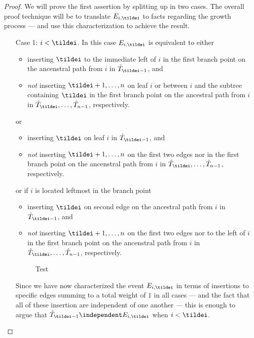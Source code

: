 \begin{proof}
    We will prove the first assertion by splitting up in two cases.
    The overall proof technique will be to translate $E_{i, \tildei}$ to facts regarding the growth process --- and use this characterization to achieve the result.
    \begin{itemize}
      \item[Case 1: $i < \tildei$.] In this case $E_{i, \tildei}$ is equivalent to either
            \begin{itemize}
              \item inserting $\tildei$ to the immediate left of $i$ in the first branch point on the ancenstral path from $i$ in $\hat{T}_{\tildei - 1}$, and
              \item \textit{not} inserting $\tildei + 1, \ldots, n$ on leaf $i$ or between $i$ and the subtree containing $\tildei$ in the first branch point on the ancestral path from $i$ in $\hat{T}_{\tildei}, \ldots, \hat{T}_{n-1}$, respectively.
            \end{itemize}
            or
            \begin{itemize}
              \item inserting $\tildei$ on leaf $i$ in $\hat{T}_{\tildei - 1}$, and
              \item \textit{not} inserting $\tildei + 1, \ldots, n$ on the first two edges nor in the first branch point on the ancenstral path from $i$ in $\hat{T}_{\tildei}, \ldots, \hat{T}_{n-1}$, respectively.
            \end{itemize}
            or if $i$ is located leftmost in the branch point
            \begin{itemize}
              \item inserting $\tildei$ on second edge on the ancestral path from $i$ in $\hat{T}_{\tildei - 1}$, and
              \item \textit{not} inserting $\tildei + 1, \ldots, n$ on the first two edges nor to the left of $i$ in the first branch point on the ancenstral path from $i$ in $\hat{T}_{\tildei}, \ldots, \hat{T}_{n-1}$, respectively.
            \end{itemize}
            \begin{figure}[t]
                \centering
                
                \caption{Test}
                \label{fig:ForbiddenEdges_1}
            \end{figure}
            Since we have now characterized the event $E_{i,\tildei}$ in terms of insertions to specific edges summing to a total weight of $1$ in all cases --- and the fact that all of these insertion are independent of one another --- this is enough to argue that $\hat{T}_{\tildei - 1} \independent E_{i, \tildei}$ when $i < \tildei$.


\end{itemize}
\end{proof}
